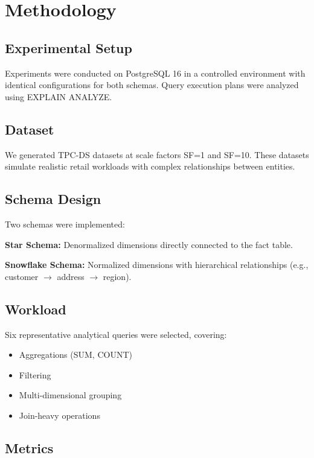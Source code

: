 \documentclass[conference]{IEEEtran}
\begin{document}
\section{Methodology}

\subsection{Experimental Setup}

Experiments were conducted on PostgreSQL 16 in a controlled environment with identical configurations for both schemas. Query execution plans were analyzed using EXPLAIN ANALYZE.

\subsection{Dataset}

We generated TPC-DS datasets at scale factors SF=1 and SF=10. These datasets simulate realistic retail workloads with complex relationships between entities.

\subsection{Schema Design}

Two schemas were implemented:

\textbf{Star Schema:}
Denormalized dimensions directly connected to the fact table.

\textbf{Snowflake Schema:}
Normalized dimensions with hierarchical relationships (e.g., customer $\rightarrow$ address $\rightarrow$ region).

\subsection{Workload}

Six representative analytical queries were selected, covering:
\begin{itemize}
\item Aggregations (SUM, COUNT)
\item Filtering
\item Multi-dimensional grouping
\item Join-heavy operations
\end{itemize}

\subsection{Metrics}
\end{document}
